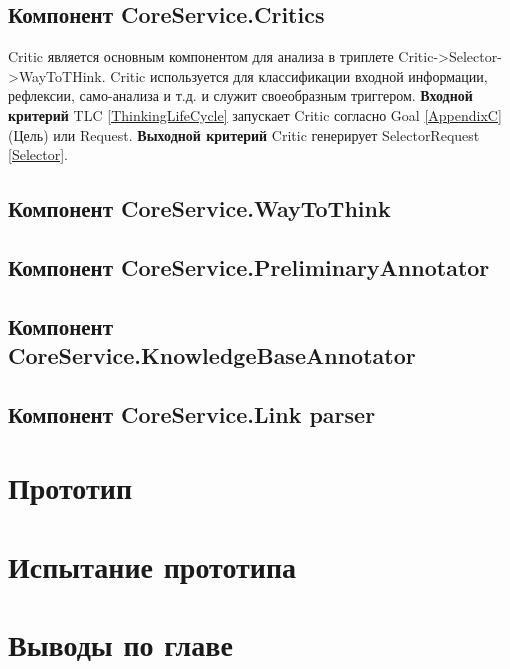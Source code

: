 \subsection{Компонент CoreService.Critics} \label{Critic}
Critic является основным компонентом для анализа в триплете Critic->Selector->WayToTHink. Critic используется для классификации входной информации, рефлексии, само-анализа и т.д. и служит своеобразным триггером.
\textbf{Входной критерий}
TLC \ref{ThinkingLifeCycle} запускает Critic согласно Goal \ref{AppendixC} (Цель) или Request. 
\textbf{Выходной критерий}
Critic генерирует SelectorRequest \ref{Selector}. 

\subsection{Компонент CoreService.WayToThink} \label{WayToThink}
\subsection{Компонент CoreService.PreliminaryAnnotator} \label{PreliminaryAnnotator}
\subsection{Компонент CoreService.KnowledgeBaseAnnotator} \label{KnowledgeBaseAnnotator}
\subsection{Компонент CoreService.Link parser} \label{Link parser}
\section{Прототип}
\section{Испытание прототипа}
\section{Выводы по главе}


\clearpage